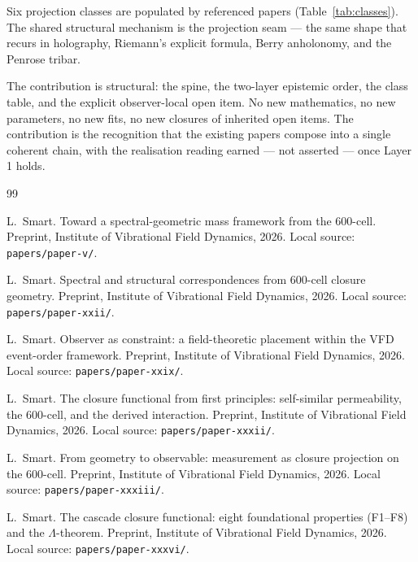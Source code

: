 \documentclass[12pt]{article}
\begin{document}
Six projection classes are populated by referenced papers (Table~\ref{tab:classes}). The shared structural mechanism is the projection seam --- the same shape that recurs in holography, Riemann's explicit formula, Berry anholonomy, and the Penrose tribar.

The contribution is structural: the spine, the two-layer epistemic order, the class table, and the explicit observer-local open item. No new mathematics, no new parameters, no new fits, no new closures of inherited open items. The contribution is the recognition that the existing papers compose into a single coherent chain, with the realisation reading earned --- not asserted --- once Layer 1 holds.


\begin{thebibliography}{99}

L.~Smart.
\newblock Toward a spectral-geometric mass framework from the 600-cell.
\newblock Preprint, Institute of Vibrational Field Dynamics, 2026.
\newblock Local source: \texttt{papers/paper-v/}.

L.~Smart.
\newblock Spectral and structural correspondences from 600-cell closure geometry.
\newblock Preprint, Institute of Vibrational Field Dynamics, 2026.
\newblock Local source: \texttt{papers/paper-xxii/}.

L.~Smart.
\newblock Observer as constraint: a field-theoretic placement within the VFD event-order framework.
\newblock Preprint, Institute of Vibrational Field Dynamics, 2026.
\newblock Local source: \texttt{papers/paper-xxix/}.

L.~Smart.
\newblock The closure functional from first principles: self-similar permeability, the 600-cell, and the derived interaction.
\newblock Preprint, Institute of Vibrational Field Dynamics, 2026.
\newblock Local source: \texttt{papers/paper-xxxii/}.

L.~Smart.
\newblock From geometry to observable: measurement as closure projection on the 600-cell.
\newblock Preprint, Institute of Vibrational Field Dynamics, 2026.
\newblock Local source: \texttt{papers/paper-xxxiii/}.

L.~Smart.
\newblock The cascade closure functional: eight foundational properties (F1--F8) and the $\Lambda$-theorem.
\newblock Preprint, Institute of Vibrational Field Dynamics, 2026.
\newblock Local source: \texttt{papers/paper-xxxvi/}.


\end{thebibliography}
\end{document}

